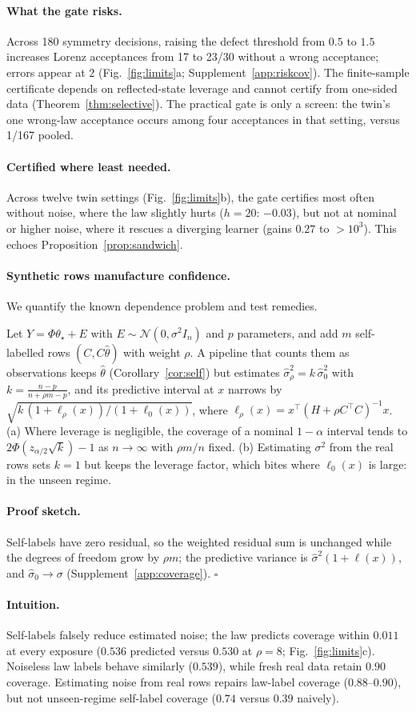 \documentclass{l4dc2027}
\newcommand{\ProofSketch}{\paragraph{Proof sketch.}}
\newcommand{\Intuition}{\paragraph{Intuition.}}
\begin{document}
\paragraph{What the gate risks.} Across 180 symmetry decisions, raising the defect threshold from $0.5$ to $1.5$ increases Lorenz acceptances from 17 to 23/30 without a wrong acceptance; errors appear at $2$ (Fig.~\ref{fig:limits}a; Supplement~\ref{app:riskcov}). The finite-sample certificate depends on reflected-state leverage and cannot certify from one-sided data (Theorem~\ref{thm:selective}). The practical gate is only a screen: the twin's one wrong-law acceptance occurs among four acceptances in that setting, versus 1/167 pooled.

\paragraph{Certified where least needed.} Across twelve twin settings (Fig.~\ref{fig:limits}b), the gate certifies most often without noise, where the law slightly hurts ($h=20$: $-0.03$), but not at nominal or higher noise, where it rescues a diverging learner (gains $0.27$ to $>10^3$). This echoes Proposition~\ref{prop:sandwich}.

\paragraph{Synthetic rows manufacture confidence.} We quantify the known dependence problem and test remedies.
\begin{proposition}\label{prop:overconf}
Let $Y=\Phi\theta_\star+E$ with $E\sim\mathcal N(0,\sigma^2I_n)$ and $p$ parameters, and add $m$ self-labelled rows $(C,C\widehat\theta)$ with weight $\rho$. A pipeline that counts them as observations keeps $\widehat\theta$ (Corollary~\ref{cor:self}) but estimates $\widehat\sigma_\rho^2=k\,\widehat\sigma_0^2$ with $k=\frac{n-p}{n+\rho m-p}$, and its predictive interval at $x$ narrows by $\sqrt{k\,(1+\ell_\rho(x))/(1+\ell_0(x))}$, where $\ell_\rho(x)=x^\top(H+\rho C^\top C)^{-1}x$. (a) Where leverage is negligible, the coverage of a nominal $1-\alpha$ interval tends to $2\Phi(z_{\alpha/2}\sqrt k)-1$ as $n\to\infty$ with $\rho m/n$ fixed. (b) Estimating $\sigma^2$ from the real rows sets $k=1$ but keeps the leverage factor, which bites where $\ell_0(x)$ is large: in the unseen regime.
\end{proposition}
\ProofSketch Self-labels have zero residual, so the weighted residual sum is unchanged while the degrees of freedom grow by $\rho m$; the predictive variance is $\widehat\sigma^2(1+\ell(x))$, and $\widehat\sigma_0\to\sigma$ (Supplement~\ref{app:coverage}). \hfill$\square$
\Intuition Self-labels falsely reduce estimated noise; the law predicts coverage within $0.011$ at every exposure ($0.536$ predicted versus $0.530$ at $\rho=8$; Fig.~\ref{fig:limits}c). Noiseless law labels behave similarly ($0.539$), while fresh real data retain $0.90$ coverage. Estimating noise from real rows repairs law-label coverage ($0.88$--$0.90$), but not unseen-regime self-label coverage ($0.74$ versus $0.39$ naively).
\end{document}
